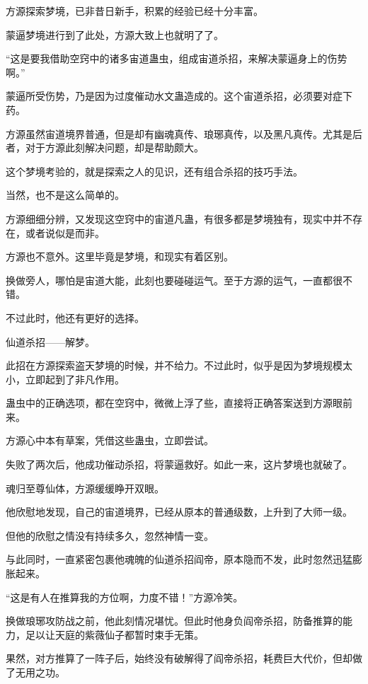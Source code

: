 
\begin{this_body}



方源探索梦境，已非昔日新手，积累的经验已经十分丰富。

蒙逼梦境进行到了此处，方源大致上也就明了了。

“这是要我借助空窍中的诸多宙道蛊虫，组成宙道杀招，来解决蒙逼身上的伤势啊。”

蒙逼所受伤势，乃是因为过度催动水文蛊造成的。这个宙道杀招，必须要对症下药。

方源虽然宙道境界普通，但是却有幽魂真传、琅琊真传，以及黑凡真传。尤其是后者，对于方源此刻解决问题，却是帮助颇大。

这个梦境考验的，就是探索之人的见识，还有组合杀招的技巧手法。

当然，也不是这么简单的。

方源细细分辨，又发现这空窍中的宙道凡蛊，有很多都是梦境独有，现实中并不存在，或者说似是而非。

方源也不意外。这里毕竟是梦境，和现实有着区别。

换做旁人，哪怕是宙道大能，此刻也要碰碰运气。至于方源的运气，一直都很不错。

不过此时，他还有更好的选择。

仙道杀招——解梦。

此招在方源探索盗天梦境的时候，并不给力。不过此时，似乎是因为梦境规模太小，立即起到了非凡作用。

蛊虫中的正确选项，都在空窍中，微微上浮了些，直接将正确答案送到方源眼前来。

方源心中本有草案，凭借这些蛊虫，立即尝试。

失败了两次后，他成功催动杀招，将蒙逼救好。如此一来，这片梦境也就破了。

魂归至尊仙体，方源缓缓睁开双眼。

他欣慰地发现，自己的宙道境界，已经从原本的普通级数，上升到了大师一级。

但他的欣慰之情没有持续多久，忽然神情一变。

与此同时，一直紧密包裹他魂魄的仙道杀招阎帝，原本隐而不发，此时忽然迅猛膨胀起来。

“这是有人在推算我的方位啊，力度不错！”方源冷笑。

换做琅琊攻防战之前，他此刻情况堪忧。但此时他身负阎帝杀招，防备推算的能力，足以让天庭的紫薇仙子都暂时束手无策。

果然，对方推算了一阵子后，始终没有破解得了阎帝杀招，耗费巨大代价，但却做了无用之功。


\end{this_body}
